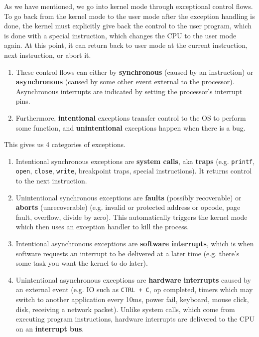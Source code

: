 \documentclass{article}
\newcounter{definition}[section]
\newcounter{code}[section]
\begin{document}
    \begin{definition}
      \label{def:types-of-exceptions-interrupts}
      As we have mentioned, we go into kernel mode through exceptional control flows. To go back from the kernel mode to the user mode after the exception handling is done, the kernel must explicitly give back the control to the user program, which is done with a special instruction, which changes the CPU to the user mode again. At this point, it can return back to user mode at the current instruction, next instruction, or abort it. 
      \begin{enumerate}
        \item These control flows can either by \textbf{synchronous} (caused by an instruction) or \textbf{asynchronous} (caused by some other event external to the processor). Asynchronous interrupts are indicated by setting the processor's interrupt pins. 
        \item Furthermore, \textbf{intentional} exceptions transfer control to the OS to perform some function, and \textbf{unintentional} exceptions happen when there is a bug. 
      \end{enumerate}
      This gives us 4 categories of exceptions. 
      \begin{enumerate}
        \item Intentional synchronous exceptions are \textbf{system calls}, aka \textbf{traps} (e.g. \texttt{printf}, \texttt{open}, \texttt{close}, \texttt{write}, breakpoint traps, special instructions). It returns control to the next instruction. 
        \item Unintentional synchronous exceptions are \textbf{faults} (possibly recoverable) or \textbf{aborts} (unrecoverable) (e.g. invalid or protected address or opcode, page fault, overflow, divide by zero). This automatically triggers the kernel mode which then uses an exception handler to kill the process.  
        \item Intentional asynchronous exceptions are \textbf{software interrupts}, which is when software requests an interrupt to be delivered at a later time (e.g. there's some task you want the kernel to do later). 
        \item Unintentional asynchronous exceptions are \textbf{hardware interrupts} caused by an external event (e.g. IO such as \texttt{CTRL + C}, op completed, timers which may switch to another application every 10ms, power fail, keyboard, mouse click, disk, receiving a network packet). Unlike system calls, which come from executing program instructions, hardware interrupts are delivered to the CPU on an \textbf{interrupt bus}. 

\end{enumerate}
\end{definition}
\end{document}
